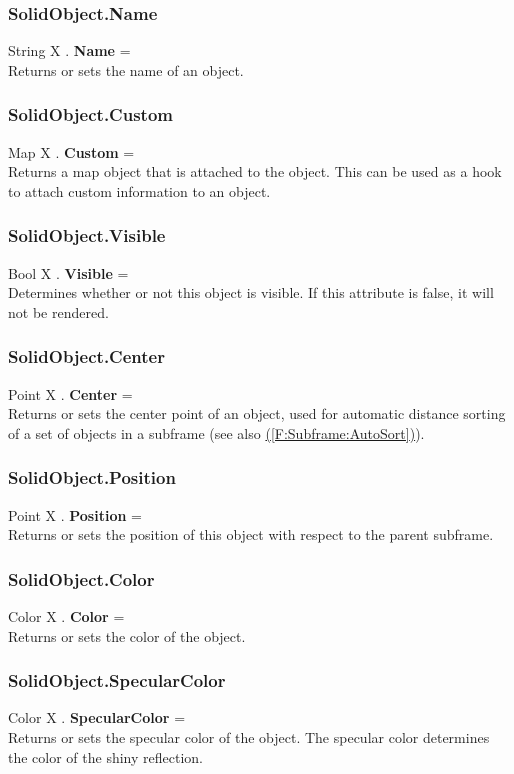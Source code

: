 \documentclass[10pt]{book}
\newcommand{\linkitem}[1]{\hyperref[#1]{\nameref{#1} (\ref{#1})}}
\begin{document}
\subsubsection{SolidObject.Name \label{F:SolidObject:Name}}
String X . \textbf{Name} = \\
Returns or sets the name of an object.

\subsubsection{SolidObject.Custom \label{F:SolidObject:Custom}}
Map X . \textbf{Custom} = \\
Returns a map object that is attached to the object. This can be used as a hook to attach custom information to an object.


\subsubsection{SolidObject.Visible \label{F:SolidObject:Visible}}
Bool X . \textbf{Visible} = \\
Determines whether or not this object is visible. If this attribute is false, it will not be rendered.

\subsubsection{SolidObject.Center \label{F:SolidObject:Center}}
Point X . \textbf{Center} = \\
Returns or sets the center point of an object, used for automatic distance sorting of a set of objects in a subframe (see also \linkitem{F:Subframe:AutoSort}).

\subsubsection{SolidObject.Position \label{F:SolidObject:Position}}
Point X . \textbf{Position} = \\
Returns or sets the position of this object with respect to the parent subframe.

\subsubsection{SolidObject.Color \label{F:SolidObject:Color}}
Color X . \textbf{Color} = \\
Returns or sets the color of the object.

\subsubsection{SolidObject.SpecularColor \label{F:SolidObject:SpecularColor}}
Color X . \textbf{SpecularColor} = \\
Returns or sets the specular color of the object. The specular color determines the color of the shiny reflection.
\end{document}
